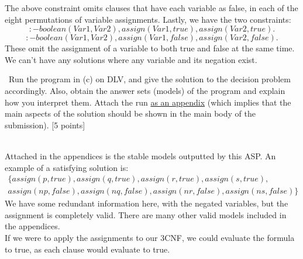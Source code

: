 \documentclass[12pt,fullpage]{article}
\begin{document}
The above constraint omits clauses that have each variable as false, in each of the eight permutations of variable assignments. Lastly, we have the two constraints:
$$:- boolean(Var1, Var2), assign(Var1, true), assign(Var2, true).$$
$$:- boolean(Var1, Var2), assign(Var1, false), assign(Var2, false).$$
These omit the assignment of a variable to both true and false at the same time. We can't have any solutions where any variable and its negation exist.

\vspace{2mm}  \ Run the program in (c) on DLV, and give the solution to the decision problem accordingly. Also, obtain the answer sets (models) of the program and explain how you interpret them. Attach the run \underline{as an appendix} (which implies that the main aspects of the solution should be shown in the main body of the submission). \hfill [5 points]

\vspace{2mm} \\
Attached in the appendices is the stable models outputted by this ASP. An example of a satisfying solution is:
\begin{equation*}
  \begin{aligned}
    \{assign(p,true), assign(q,true), assign(r,true), assign(s, true),\\
    assign(np,false), assign(nq,false), assign(nr,false), assign(ns,false)\}
  \end{aligned}
\end{equation*}
We have some redundant information here, with the negated variables, but the assignment is completely valid. There are many other valid models included in the appendices.\\
If we were to apply the assignments to our 3CNF, we could evaluate the formula to true, as each clause would evaluate to true.
\newpage \hspace*{7cm}{\bf \large Appendices}

\vspace{0.5cm}
\end{document}
